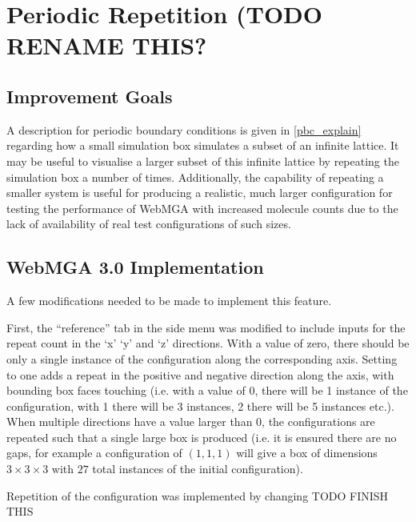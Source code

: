 \section{Periodic Repetition (TODO RENAME THIS?}
\subsection{Improvement Goals}
A description for periodic boundary conditions is given in \cref{pbc_explain} regarding how a small simulation box simulates a subset of an infinite lattice. It may be useful to visualise a larger subset of this infinite lattice by repeating the simulation box a number of times. Additionally, the capability of repeating a smaller system is useful for producing a realistic, much larger configuration for testing the performance of WebMGA with increased molecule counts due to the lack of availability of real test configurations of such sizes.

\subsection{WebMGA 3.0 Implementation}
A few modifications needed to be made to implement this feature.

First, the ``reference'' tab in the side menu was modified to include inputs for the repeat count in the `x' `y' and `z' directions. With a value of zero, there should be only a single instance of the configuration along the corresponding axis. Setting to one adds a repeat in the positive and negative direction along the axis, with bounding box faces touching (i.e. with a value of 0, there will be 1 instance of the configuration, with 1 there will be 3 instances, 2 there will be 5 instances etc.). When multiple directions have a value larger than 0, the configurations are repeated such that a single large box is produced (i.e. it is ensured there are no gaps, for example a configuration of $(1,1,1)$ will give a box of dimensions $3\times 3\times 3$ with $27$ total instances of the initial configuration).

Repetition of the configuration was implemented by changing TODO FINISH THIS

